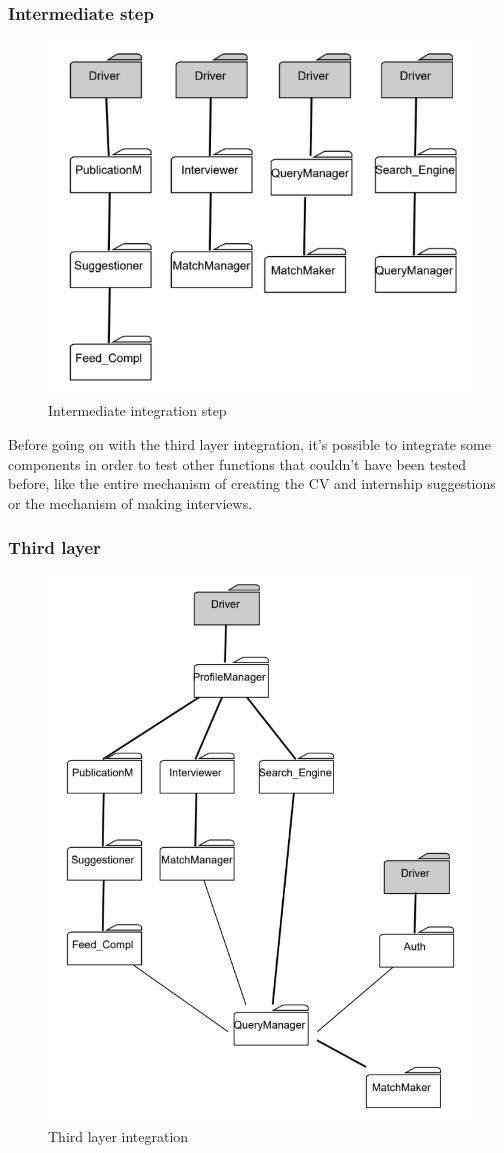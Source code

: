 \documentclass{article}
\begin{document}
\subsubsection{Intermediate step}
\begin{figure}[H]
    \centering
    \includegraphics[width=0.5\linewidth]{Integration/intermediateLayerIntegration.png}
    \caption{Intermediate integration step}
    \label{fig:enter-label}
\end{figure}
Before going on with the third layer integration, it's possible to integrate some components in order to test other functions that couldn't have been tested before, like the entire mechanism of creating the CV and internship suggestions or the mechanism of making interviews.

\subsubsection{Third layer}
\begin{figure}[H]
    \centering
    \includegraphics[width=0.5\linewidth]{Integration/ThirdLayerIntegration.png}
    \caption{Third layer integration}
    \label{fig:enter-label}
\end{figure}
\end{document}
